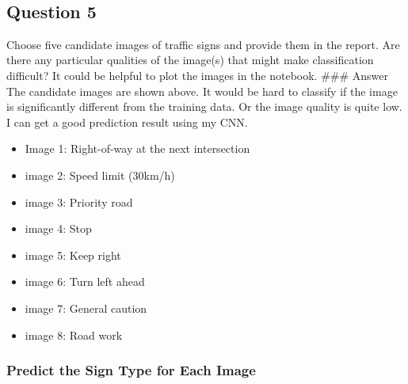 \documentclass[11pt]{article}
\providecommand{\tightlist}{%
      \setlength{\itemsep}{0pt}\setlength{\parskip}{0pt}}
\begin{document}
    \begin{center}
    \end{center}
    { \hspace*{\fill} \\}
    
    \hypertarget{question-5}{%
\subsection{Question 5}\label{question-5}}

Choose five candidate images of traffic signs and provide them in the
report. Are there any particular qualities of the image(s) that might
make classification difficult? It could be helpful to plot the images in
the notebook. \#\#\# Answer The candidate images are shown above. It
would be hard to classify if the image is significantly different from
the training data. Or the image quality is quite low. I can get a good
prediction result using my CNN.

\begin{itemize}
\tightlist
\item
  Image 1: Right-of-way at the next intersection
\item
  image 2: Speed limit (30km/h)
\item
  image 3: Priority road
\item
  image 4: Stop
\item
  image 5: Keep right
\item
  image 6: Turn left ahead
\item
  image 7: General caution
\item
  image 8: Road work
\end{itemize}

    \hypertarget{predict-the-sign-type-for-each-image}{%
\subsubsection{Predict the Sign Type for Each
Image}\label{predict-the-sign-type-for-each-image}}
\end{document}

